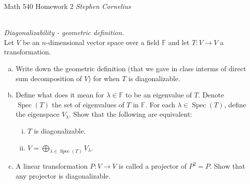 \documentclass{article}
\begin{document}
\begin{center}
    Math 540
    \hfill Homework 2
    \hfill \textit{Stephen Cornelius}
\end{center}




\begin{problem} \\
    \textit{Diagonalizability - geometric definition.} \\
    Let $V$ be an $n$-dimensional vector space over a field $\mathbb{F}$ and let $T: V \to V$ a transformation.
    \begin{enumerate}[(a)]
        \item Write down the geometric definition (that we gave in class interms of direct sum decomposition of $V$) for when $T$ is diagonalizable.
        \item Define what does it mean for $\lambda \in \mathbb{F}$ to be an eigenvalue of $T$. Denote $\operatorname{Spec}(T)$ the set of eigenvalues of $T$ in $\mathbb{F}$. For each $\lambda \in \operatorname{Spec}(T)$, define the eigenspace $V_{\lambda}$. Show that the following are equivalent:
        \begin{enumerate}[(i)]
            \item $T$ is diagonalizable.
            \item $V = \bigoplus_{\lambda \in \operatorname{Spec}(T)} V_{\lambda}$.
        \end{enumerate}

        \item A linear transformation $P: V \to V$ is called a projector of $P^2 = P$. Show that any projector is diagonalizable.
    \end{enumerate}
\end{problem}
\end{document}

